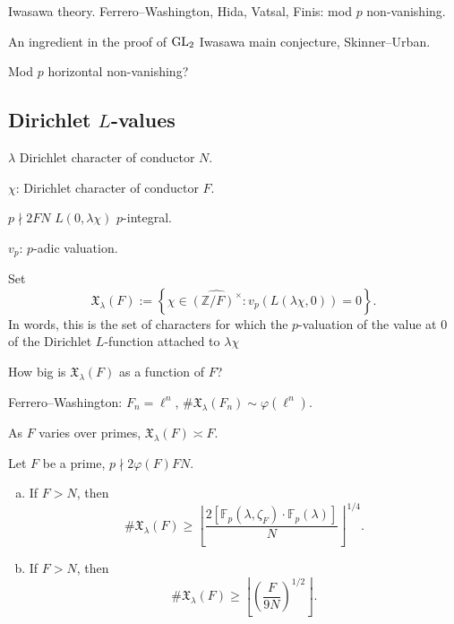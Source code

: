 \documentclass[reqno]{amsart} 
\begin{document}
Iwasawa theory.  Ferrero--Washington, Hida, Vatsal, Finis: mod $p$ non-vanishing.

An ingredient in the proof of $\operatorname{GL}_2$ Iwasawa main conjecture, Skinner--Urban.

Mod $p$ horizontal non-vanishing?

\subsection{Dirichlet $L$-values}
$\lambda$ Dirichlet character of conductor $N$.

$\chi$: Dirichlet character of conductor $F$.

$p \nmid 2 F N$ $L(0, \lambda \chi)$ $p$-integral.

$v_p$: $p$-adic valuation.

Set
\begin{equation*}
\mathfrak{X}_\lambda(F) := \left\{ \chi \in \widehat{(\mathbb{Z} / F)^\times } : v_p \left( L(\lambda \chi, 0) \right) = 0 \right\}.
\end{equation*}
In words, this is the set of characters for which the $p$-valuation of the value at $0$ of the Dirichlet $L$-function attached to $\lambda \chi$

\begin{question}\label{question:cnfg5j4tbm}
  How big is $\mathfrak{X}_\lambda(F) $ as a function of $F$?
\end{question}

Ferrero--Washington: $F_n = \ell^n$, $\# \mathfrak{X}_\lambda(F_n) \sim \varphi(\ell^n)$.

As $F$ varies over primes, $\mathfrak{X}_\lambda(F) \asymp F$.

\begin{theorem}[Sun--B]\label{theorem:cnfg5jyjlh}
  Let $F$ be a prime, $p \nmid 2 \varphi(F) F N$.
  \begin{enumerate}[(a)]
  \item\label{enumerate:cnekzumaui} If $F > N$, then
    \begin{equation*}
      \# \mathfrak{X}_\lambda(F) \geq
      \left\lfloor
        \frac{2 [\mathbb{F}_p(\lambda, \zeta_F ) \cdot \mathbb{F}_p(\lambda) ]}{N}
      \right\rfloor^{1/4}.
    \end{equation*}
  \item\label{enumerate:cnekzumb90} If $F > N$, then
    \begin{equation*}
      \# \mathfrak{X}_\lambda(F) \geq
      \left\lfloor
        \left( \frac{F}{9 N} \right)^{1/2}
      \right\rfloor.
    \end{equation*}
  \end{enumerate}
\end{theorem}
\end{document}
